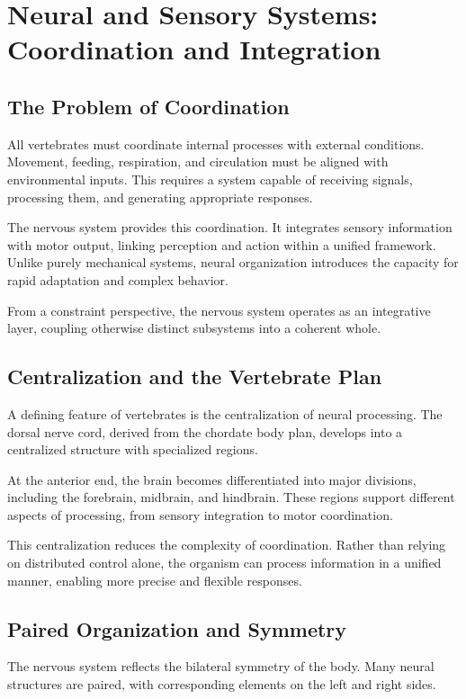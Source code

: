 \documentclass[11pt,oneside]{book}
\begin{document}
\chapter{Neural and Sensory Systems: Coordination and Integration}

\section{The Problem of Coordination}

All vertebrates must coordinate internal processes with external conditions. Movement, feeding, respiration, and circulation must be aligned with environmental inputs. This requires a system capable of receiving signals, processing them, and generating appropriate responses.

The nervous system provides this coordination. It integrates sensory information with motor output, linking perception and action within a unified framework. Unlike purely mechanical systems, neural organization introduces the capacity for rapid adaptation and complex behavior.

From a constraint perspective, the nervous system operates as an integrative layer, coupling otherwise distinct subsystems into a coherent whole.

\section{Centralization and the Vertebrate Plan}

A defining feature of vertebrates is the centralization of neural processing. The dorsal nerve cord, derived from the chordate body plan, develops into a centralized structure with specialized regions.

At the anterior end, the brain becomes differentiated into major divisions, including the forebrain, midbrain, and hindbrain. These regions support different aspects of processing, from sensory integration to motor coordination.

This centralization reduces the complexity of coordination. Rather than relying on distributed control alone, the organism can process information in a unified manner, enabling more precise and flexible responses.

\section{Paired Organization and Symmetry}

The nervous system reflects the bilateral symmetry of the body. Many neural structures are paired, with corresponding elements on the left and right sides.
\end{document}
